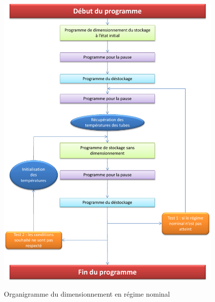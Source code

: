 \begin{figure}[!h]
	\centering
	\caption{Organigramme du dimensionnement en régime nominal}
	\includegraphics[scale=0.75]{PHOTO/organigramme_final.pdf}
	\label{graph3}
\end{figure}

\newpage
